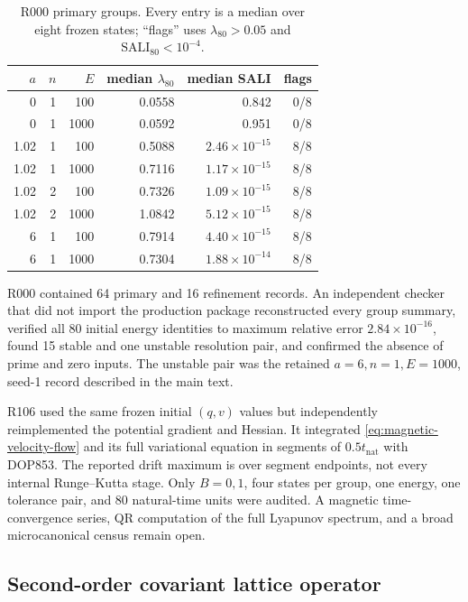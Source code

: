 \begin{table}[p]
 \centering
 \caption{R000 primary groups.  Every entry is a median over eight frozen
 states; ``flags'' uses \(\lambda_{80}>0.05\) and
 \(\mathrm{SALI}_{80}<10^{-4}\).}
 \label{tab:r000-full}
 \small
 \begin{tabular}{@{}rrrrrr@{}}
 \toprule
 \(a\) & \(n\) & \(E\) & median \(\lambda_{80}\) & median SALI & flags \\
 \midrule
 0    & 1 & 100  & 0.0558 & 0.842 & 0/8 \\
 0    & 1 & 1000 & 0.0592 & 0.951 & 0/8 \\
 1.02 & 1 & 100  & 0.5088 & \(2.46\times10^{-15}\) & 8/8 \\
 1.02 & 1 & 1000 & 0.7116 & \(1.17\times10^{-15}\) & 8/8 \\
 1.02 & 2 & 100  & 0.7326 & \(1.09\times10^{-15}\) & 8/8 \\
 1.02 & 2 & 1000 & 1.0842 & \(5.12\times10^{-15}\) & 8/8 \\
 6    & 1 & 100  & 0.7914 & \(4.40\times10^{-15}\) & 8/8 \\
 6    & 1 & 1000 & 0.7304 & \(1.88\times10^{-14}\) & 8/8 \\
 \bottomrule
 \end{tabular}
\end{table}

R000 contained 64 primary and 16 refinement records.  An independent checker
that did not import the production package reconstructed every group summary,
verified all 80 initial energy identities to maximum relative error
\(2.84\times10^{-16}\), found 15 stable and one unstable resolution pair,
and confirmed the absence of prime and zero inputs.  The unstable pair was
the retained \(a=6,n=1,E=1000\), seed-1 record described in the main text.

R106 used the same frozen initial \((q,v)\) values but independently
reimplemented the potential gradient and Hessian.  It integrated
\cref{eq:magnetic-velocity-flow} and its full variational equation in segments
of \(0.5t_{\mathrm{nat}}\) with DOP853.  The reported drift maximum is over
segment endpoints, not every internal Runge--Kutta stage.  Only \(B=0,1\),
four states per group, one energy, one tolerance pair, and 80 natural-time
units were audited.  A magnetic time-convergence series, QR computation of
the full Lyapunov spectrum, and a broad microcanonical census remain open.

\subsection{Second-order covariant lattice operator}

